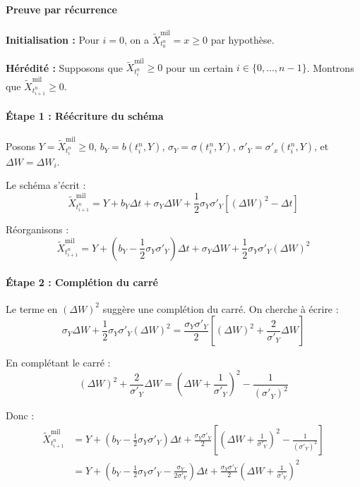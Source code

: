 \documentclass[12pt,a4paper]{article}
\theoremstyle{definition}
\theoremstyle{remark}
\begin{document}
\paragraph{Preuve par récurrence}

\textbf{Initialisation :} Pour $i=0$, on a $\tilde{X}_{t_0^n}^{\text{mil}} = x \geq 0$ par hypothèse.

\textbf{Hérédité :} Supposons que $\tilde{X}_{t_i^n}^{\text{mil}} \geq 0$ pour un certain $i \in \{0,\ldots,n-1\}$. Montrons que $\tilde{X}_{t_{i+1}^n}^{\text{mil}} \geq 0$.

\paragraph{Étape 1 : Réécriture du schéma}
Posons $Y = \tilde{X}_{t_i^n}^{\text{mil}} \geq 0$, $b_Y = b(t_i^n, Y)$, $\sigma_Y = \sigma(t_i^n, Y)$, $\sigma'_Y = \sigma'_x(t_i^n, Y)$, et $\Delta W = \Delta W_i$.

Le schéma s'écrit :
\begin{equation}
\tilde{X}_{t_{i+1}^n}^{\text{mil}} = Y + b_Y \Delta t + \sigma_Y \Delta W + \frac{1}{2}\sigma_Y \sigma'_Y [(\Delta W)^2 - \Delta t]
\end{equation}

Réorganisons :
\begin{equation}
\tilde{X}_{t_{i+1}^n}^{\text{mil}} = Y + \left(b_Y - \frac{1}{2}\sigma_Y \sigma'_Y\right)\Delta t + \sigma_Y \Delta W + \frac{1}{2}\sigma_Y \sigma'_Y (\Delta W)^2
\end{equation}

\paragraph{Étape 2 : Complétion du carré}
Le terme en $(\Delta W)^2$ suggère une complétion du carré. On cherche à écrire :
\[
\sigma_Y \Delta W + \frac{1}{2}\sigma_Y \sigma'_Y (\Delta W)^2 = \frac{\sigma_Y \sigma'_Y}{2}\left[(\Delta W)^2 + \frac{2}{\sigma'_Y}\Delta W\right]
\]

En complétant le carré :
\[
(\Delta W)^2 + \frac{2}{\sigma'_Y}\Delta W = \left(\Delta W + \frac{1}{\sigma'_Y}\right)^2 - \frac{1}{(\sigma'_Y)^2}
\]

Donc :
\begin{align*}
\tilde{X}_{t_{i+1}^n}^{\text{mil}} &= Y + \left(b_Y - \frac{1}{2}\sigma_Y \sigma'_Y\right)\Delta t + \frac{\sigma_Y \sigma'_Y}{2}\left[\left(\Delta W + \frac{1}{\sigma'_Y}\right)^2 - \frac{1}{(\sigma'_Y)^2}\right] \\
&= Y + \left(b_Y - \frac{1}{2}\sigma_Y \sigma'_Y - \frac{\sigma_Y}{2\sigma'_Y}\right)\Delta t + \frac{\sigma_Y \sigma'_Y}{2}\left(\Delta W + \frac{1}{\sigma'_Y}\right)^2
\end{align*}
\end{document}
